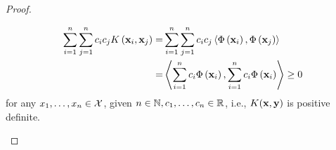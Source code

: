 \begin{proof}
\begin{enumerate}
		      \begin{equation*}
			      \begin{aligned}
				      \sum_{i=1}^{n}\sum_{j=1}^{n}c_{i}c_{j}K\left({\bf x}_{i},{\bf x}_{j}\right)= & \sum_{i=1}^{n}\sum_{j=1}^{n}c_{i}c_{j}\left\langle\Phi\left({\bf x}_{i}\right),\Phi\left({\bf x}_{j}\right)\right\rangle       \\
				      =                                                                      & \left\langle\sum_{i=1}^{n}c_{i}\Phi\left({\bf x}_{i}\right),\sum_{i=1}^{n}c_{i}\Phi\left({\bf x}_{i}\right)\right\rangle\geq 0
			      \end{aligned}
		      \end{equation*}
		      for any $x_{1},\ldots,x_{n}\in{\mathcal X}$, given $n\in\mathbb{N},c_{1},\ldots,c_{n}\in{\mathbb R}$, i.e., $K({\bf x},\mathbf{y})$ is positive definite.
	\end{enumerate}
\end{proof}

